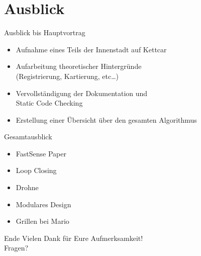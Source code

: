 \documentclass{beamer}
\begin{document}
\section{Ausblick}

\begin{frame}{Ausblick bis Hauptvortrag}
\begin{itemize}
\item{Aufnahme eines Teils der Innenstadt auf Kettcar}
\item{Aufarbeitung theoretischer Hintergründe \\
(Registrierung, Kartierung, etc\dots)}
\item{Vervollständigung der Dokumentation und \\
Static Code Checking}
\item{Erstellung einer Übersicht über den gesamten Algorithmus}
\end{itemize}
\end{frame}

\begin{frame}{Gesamtausblick}
\begin{itemize}
\item{FastSense Paper}
\item{Loop Closing}
\item{Drohne}
\item{Modulares Design}
\item{Grillen bei Mario}
\end{itemize}
\end{frame}

\begin{frame}{Ende}
\centering\LARGE
Vielen Dank für Eure Aufmerksamkeit!\\\vspace{1cm}
Fragen?
\end{frame}
\end{document}
